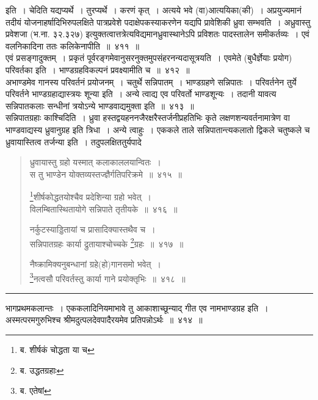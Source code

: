 \documentclass[11pt, openany]{book}
\begin{document}
\noindent
इति~। चेदिति यद्यप्यर्थे~। तुरप्यर्थे~। करणं कृत्~। अत्यये भवे (वा){\qtt आत्ययिका}(की)~। अप्रयुज्यमानं तदीयं योजनाहर्षादिभिरुपलक्षिते पात्रप्रवेशे पदाक्षेपकस्याकरणेन यद्यपि प्रावेशिकी ध्रुवा सम्भवति~। {\qtt अध्रुवास्तु प्रवेशजा} (भ.ना. ३२.३२७) इत्युक्तत्वात्तत्रेत्यविद्यमानध्रुवास्थानेऽपि प्रविशतः पादस्तालेन समीकर्तव्यः~। एवं वलनिकादिना ततः कलिकेनापीति~॥~४११~॥\\

एवं प्रसङ्गादुक्तम्~। प्रकृतं पूर्वरङ्गमेवानुसरनुक्तमुपसंहरनन्यदासूत्रयति~। {\qtt एवमेते (बुधैर्ज्ञेयाः प्रयोग) परिवर्तका} इति~। भाण्डग्रहविकल्पनं प्रवक्ष्यामीति च~॥~४१२~॥\\

{\qtt अभाण्डमेव गानस्य} परिवर्तनं प्रयोजनम्~। {\qtt चतुर्थे} सन्निपातम्~। भाण्डग्रहणे सन्निपातः~। परिवर्तनेन तुर्ये परिवर्तने भाण्डग्रहाद्यास्त्रयः शून्या इति~। अन्ये त्वाद्य एव परिवर्तो भाण्डशून्यः~। तदानी यावत्य सन्निपातकलाः सन्धीनां त्रयोऽन्ये भाण्डवाद्यमुक्ता इति~॥~४१३~॥\\

{\qtt सन्निपातग्रहाः काश्चिदिति~।} ध्रुवा हस्तद्वयहननजैरक्षरैस्तर्जनीप्रहतिभिः कृते लक्षणशन्यवर्तनामात्रेण वा भाण्डवाद्यस्य ध्रुवानुग्रह इति त्रिधा~। अन्ये त्वाहुः~। एककले ताले सन्निपातान्त्यकलातो द्विकले चतुष्कले च ध्रुवायास्तित्व तर्जन्या इति~। तदुपलक्षिततुर्यपादे

\newpage

\begin{quote}
{\na ध्रुवायास्तु ग्रहो यस्मात् कलाकाललयान्वितः~।\\
 स तु भाण्डेन योक्तव्यस्तज्ज्ञैर्गतिपरिक्रमे~॥~४१५~॥

 \renewcommand{\thefootnote}{1}\footnote{ब. शीर्षकं चोद्धता या च}शीर्षकोद्धतयोश्चैव प्रदेशिन्या ग्रहो भवेत्~।\\
 विलम्बितास्थितायोगे सन्निपाते तृतीयके~॥~४१६~॥

 नर्कुटस्याड्डितायां च प्रासादिक्यास्तथैव च~।\\
 सन्निपातग्रहः कार्या द्रुतायाश्चोच्चके \renewcommand{\thefootnote}{2}\footnote{ब. उद्धतग्रहाः}ग्रहः~॥~४१७~॥

 नैष्क्रामिक्यनुबन्धानां ग्रहे(हो)गानसमो भवेत्~।\\
 \renewcommand{\thefootnote}{3}\footnote{ब. एतेषां}नत्वसौ परिवर्तस्तु कार्या गाने प्रयोक्तृभिः~॥~४१८~॥}
\end{quote}

\hrule

\vspace{2mm}
\noindent
{\qtt भागप्रथमकलान्तः}~। एककलादिनियमाभावे तु आकाशाच्छून्याद् गीत एव {\qtt नामभाण्डग्रह} इति~। {\qtt अस्मत्परमगुरुभिश्च} श्रीमदुत्पलदेवपादैरयमेव प्रतिपन्नोऽर्थः~॥~४१४~॥\\
\end{document}
